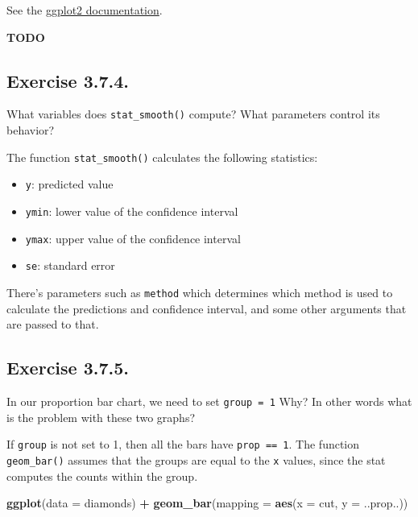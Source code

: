 \documentclass[]{book}
\newenvironment{Shaded}{\begin{snugshade}}{\end{snugshade}}
\newcommand{\DataTypeTok}[1]{\textcolor[rgb]{0.13,0.29,0.53}{#1}}
\newcommand{\KeywordTok}[1]{\textcolor[rgb]{0.13,0.29,0.53}{\textbf{#1}}}
\newcommand{\NormalTok}[1]{#1}
\newcommand{\OperatorTok}[1]{\textcolor[rgb]{0.81,0.36,0.00}{\textbf{#1}}}
\newcommand{\StringTok}[1]{\textcolor[rgb]{0.31,0.60,0.02}{#1}}
\providecommand{\tightlist}{%
  \setlength{\itemsep}{0pt}\setlength{\parskip}{0pt}}
\theoremstyle{plain}
\theoremstyle{remark}
\begin{document}
See the \href{https://ggplot2.tidyverse.org/reference/}{ggplot2 documentation}.

\textbf{TODO}

\hypertarget{exercise-3.7.4.}{%
\subsection*{\texorpdfstring{Exercise {3.7.4}.}{Exercise 3.7.4.}}\label{exercise-3.7.4.}}

What variables does \texttt{stat\_smooth()} compute? What parameters control its behavior?

The function \texttt{stat\_smooth()} calculates the following statistics:

\begin{itemize}
\tightlist
\item
  \texttt{y}: predicted value
\item
  \texttt{ymin}: lower value of the confidence interval
\item
  \texttt{ymax}: upper value of the confidence interval
\item
  \texttt{se}: standard error
\end{itemize}

There's parameters such as \texttt{method} which determines which method is used to calculate the predictions and confidence interval, and some other arguments that are passed to that.

\hypertarget{exercise-3.7.5.}{%
\subsection*{\texorpdfstring{Exercise {3.7.5}.}{Exercise 3.7.5.}}\label{exercise-3.7.5.}}

In our proportion bar chart, we need to set \texttt{group\ =\ 1} Why?
In other words what is the problem with these two graphs?

If \texttt{group} is not set to 1, then all the bars have \texttt{prop\ ==\ 1}.
The function \texttt{geom\_bar()} assumes that the groups are equal to the \texttt{x} values, since the stat computes the counts within the group.

\begin{Shaded}
\begin{Highlighting}[]
\KeywordTok{ggplot}\NormalTok{(}\DataTypeTok{data =}\NormalTok{ diamonds) }\OperatorTok{+}
\StringTok{  }\KeywordTok{geom_bar}\NormalTok{(}\DataTypeTok{mapping =} \KeywordTok{aes}\NormalTok{(}\DataTypeTok{x =}\NormalTok{ cut, }\DataTypeTok{y =}\NormalTok{ ..prop..))}
\end{Highlighting}
\end{Shaded}
\end{document}
